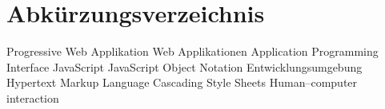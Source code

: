 \chapter*{Abkürzungsverzeichnis}
\pagestyle{plain}

\begin{acronym}[AUTOSAR]

   				{Progressive Web Applikation}
 			{Web Applikationen}
  				{Application Programming Interface}
  				{JavaScript}
  				{JavaScript Object Notation}
  				{Entwicklungsumgebung}
 				{Hypertext Markup Language}
 				{Cascading Style Sheets}
 				{Human–computer interaction}
\end{acronym}